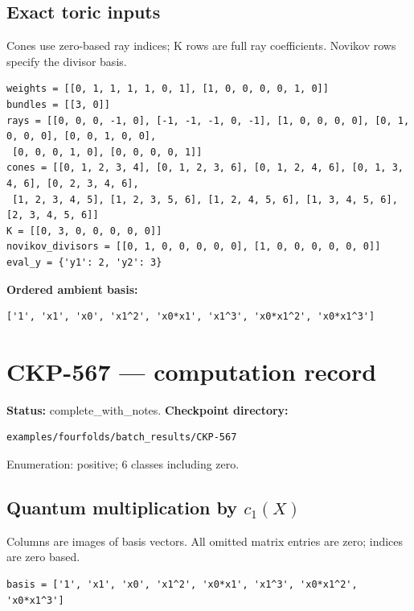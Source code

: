\documentclass[10pt,a4paper]{article}
\begin{document}
\subsection*{Exact toric inputs}
Cones use zero-based ray indices; K rows are full ray coefficients. Novikov rows specify the divisor basis.

\begin{lstlisting}
weights = [[0, 1, 1, 1, 1, 0, 1], [1, 0, 0, 0, 0, 1, 0]]
bundles = [[3, 0]]
rays = [[0, 0, 0, -1, 0], [-1, -1, -1, 0, -1], [1, 0, 0, 0, 0], [0, 1, 0, 0, 0], [0, 0, 1, 0, 0],
 [0, 0, 0, 1, 0], [0, 0, 0, 0, 1]]
cones = [[0, 1, 2, 3, 4], [0, 1, 2, 3, 6], [0, 1, 2, 4, 6], [0, 1, 3, 4, 6], [0, 2, 3, 4, 6],
 [1, 2, 3, 4, 5], [1, 2, 3, 5, 6], [1, 2, 4, 5, 6], [1, 3, 4, 5, 6], [2, 3, 4, 5, 6]]
K = [[0, 3, 0, 0, 0, 0, 0]]
novikov_divisors = [[0, 1, 0, 0, 0, 0, 0], [1, 0, 0, 0, 0, 0, 0]]
eval_y = {'y1': 2, 'y2': 3}
\end{lstlisting}

\textbf{Ordered ambient basis:}
\begin{lstlisting}
['1', 'x1', 'x0', 'x1^2', 'x0*x1', 'x1^3', 'x0*x1^2', 'x0*x1^3']
\end{lstlisting}

\clearpage\section*{CKP-567 --- computation record}
\textbf{Status:} complete\_with\_notes.
\textbf{Checkpoint directory:}
\begin{lstlisting}
examples/fourfolds/batch_results/CKP-567
\end{lstlisting}

Enumeration: positive; 6 classes including zero.
\subsection*{Quantum multiplication by $c_1(X)$}
Columns are images of basis vectors. All omitted matrix entries are zero; indices are zero based.

\begin{lstlisting}
basis = ['1', 'x1', 'x0', 'x1^2', 'x0*x1', 'x1^3', 'x0*x1^2', 'x0*x1^3']
\end{lstlisting}
\end{document}
